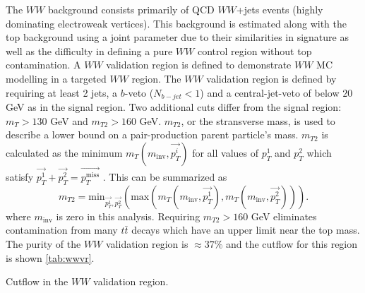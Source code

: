 The $WW$ background consists primarily of QCD $WW$+jets events (highly dominating electroweak vertices). This background is estimated along with the top background using a joint parameter due to their similarities in signature as well as the difficulty in defining a pure $WW$ control region without top contamination. A $WW$ validation region is defined to demonstrate $WW$ MC modelling in a targeted $WW$ region.  The $WW$ validation region is defined by requiring at least 2 jets, a $b$-veto ($N_{b-jet}<1$) and a central-jet-veto of below $20$ GeV as in the signal region. Two additional cuts differ from the signal region: $m_T>130$ GeV and $m_{T2}>160$ GeV. $m_{T2}$, or the stransverse mass, is used to describe a lower bound on a pair-production parent particle's mass. $m_{T2}$ is calculated as the minimum $m_T(m_{\text{inv}},\vec{p_T^i})$ for all values of $p_T^1$ and $p_T^2$ which satisfy $\vec{p_T^1}+\vec{p_T^2}=\vec{p_T^{\text{miss}}}$ \cite{MT2}. This can be summarized as
\begin{equation}
m_{T2}=\text{min}_{\vec{p_T^1},\vec{p_T^2}}(\text{max}(m_T(m_{\text{inv}},\vec{p_T^1}),m_T(m_{\text{inv}},\vec{p_T^2}))).
\end{equation}
where $m_{\text{inv}}$ is zero in this analysis. Requiring $m_{T2}>160$ GeV eliminates contamination from many $t\bar{t}$ decays which have an upper limit near the top mass. The purity of the $WW$ validation region is $\approx 37\%$ and the cutflow for this region is shown \ref{tab:wwvr}.

\begin{table}[h!]
\scalebox{0.55}{

}
\caption{Cutflow in the $WW$ validation region.}
\label{tab:wwvr}
\end{table}

